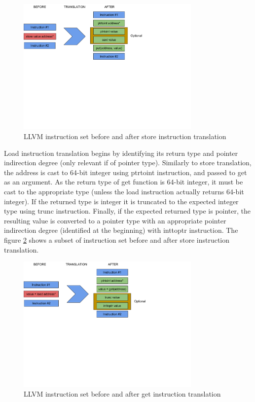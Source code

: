 \documentclass[bsc,frontabs,twoside,singlespacing,parskip,deptreport]{infthesis}     %
\begin{document}
\begin{figure}[H]
\centering
\includegraphics[width=0.8\textwidth]{images/store_translation}
\caption{LLVM instruction set before and after store instruction translation}
\label{fig:store_translation}
\end{figure}

Load instruction translation begins by identifying its return type and pointer indirection degree (only relevant if of pointer type). Similarly to store translation, the address is cast to 64-bit integer using ptrtoint instruction, and passed to get as an argument. As the return type of get function is 64-bit integer, it must be cast to the appropriate type (unless the load instruction actually returns 64-bit integer). If the returned type is integer it is truncated to the expected integer type using trunc instruction. Finally, if the expected returned type is pointer, the resulting value is converted to a pointer type with an appropriate pointer indirection degree (identified at the beginning) with inttoptr instruction. The figure \ref{fig:load_translation} shows a subset of instruction set before and after store instruction translation.

\begin{figure}[H]
\centering
\includegraphics[width=0.8\textwidth]{images/load_translation}
\caption{LLVM instruction set before and after get instruction translation}
\label{fig:load_translation}
\end{figure}
\end{document}
